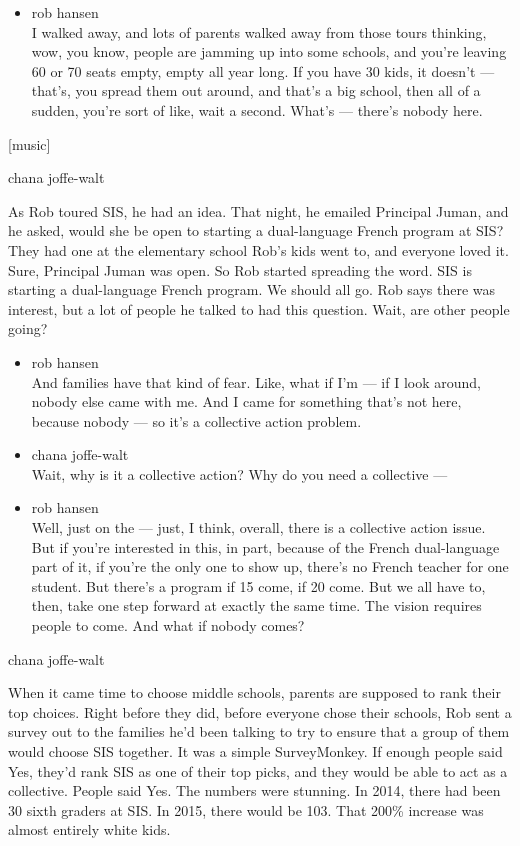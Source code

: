 \begin{itemize}
\tightlist
\item
  rob hansen\\
  I walked away, and lots of parents walked away from those tours
  thinking, wow, you know, people are jamming up into some schools, and
  you're leaving 60 or 70 seats empty, empty all year long. If you have
  30 kids, it doesn't --- that's, you spread them out around, and that's
  a big school, then all of a sudden, you're sort of like, wait a
  second. What's --- there's nobody here.
\end{itemize}

{[}music{]}

chana joffe-walt

As Rob toured SIS, he had an idea. That night, he emailed Principal
Juman, and he asked, would she be open to starting a dual-language
French program at SIS? They had one at the elementary school Rob's kids
went to, and everyone loved it. Sure, Principal Juman was open. So Rob
started spreading the word. SIS is starting a dual-language French
program. We should all go. Rob says there was interest, but a lot of
people he talked to had this question. Wait, are other people going?

\begin{itemize}
\item
  rob hansen\\
  And families have that kind of fear. Like, what if I'm --- if I look
  around, nobody else came with me. And I came for something that's not
  here, because nobody --- so it's a collective action problem.
\item
  chana joffe-walt\\
  Wait, why is it a collective action? Why do you need a collective ---
\item
  rob hansen\\
  Well, just on the --- just, I think, overall, there is a collective
  action issue. But if you're interested in this, in part, because of
  the French dual-language part of it, if you're the only one to show
  up, there's no French teacher for one student. But there's a program
  if 15 come, if 20 come. But we all have to, then, take one step
  forward at exactly the same time. The vision requires people to come.
  And what if nobody comes?
\end{itemize}

chana joffe-walt

When it came time to choose middle schools, parents are supposed to rank
their top choices. Right before they did, before everyone chose their
schools, Rob sent a survey out to the families he'd been talking to try
to ensure that a group of them would choose SIS together. It was a
simple SurveyMonkey. If enough people said Yes, they'd rank SIS as one
of their top picks, and they would be able to act as a collective.
People said Yes. The numbers were stunning. In 2014, there had been 30
sixth graders at SIS. In 2015, there would be 103. That 200\% increase
was almost entirely white kids.

